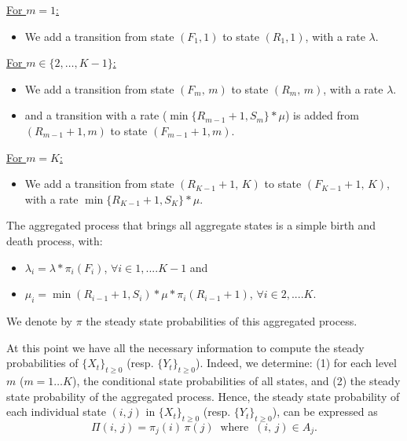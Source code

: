 \documentclass[conference]{IEEEtran}
\begin{document}
\underline{For $m=1$:}

\begin{itemize}
    \item We add a transition  from state $(F_{1},1)$ to state $(R_{1},1)$, with a rate $\lambda$.
\end{itemize}

\underline{For $m \in \{2,\ldots,K-1\}$:}

\begin{itemize}
    \item We add a transition from state $(F_{m},\,m)$ to state $(R_{m},\,m)$,  with a rate $\lambda$.
    \item and a transition with a rate ($\min\{R_{m-1}+1,S_m\}*\mu$) is added from $(R_{m-1}+1,m)$ to state $(F_{m-1}+1,m)$.
\end{itemize}

\underline{For $m=K$:}

\begin{itemize}
    \item We add a transition from state $(R_{K-1}+1,\, K)$ to state $(F_{K-1}+1,\,K)$, with a rate $\min\{R_{K-1}+1,S_K\}*\mu$.
\end{itemize}



The aggregated process that brings all aggregate states  is a simple birth and death process, with:

\begin{itemize}
\item $\lambda_{i}=\lambda*\pi_{i}(F_{i})$,\;\; $\forall i \in {1,....K-1}$ and

\item $\mu_{i}=\min(R_{i-1}+1,S_i)*\mu*\pi_{i}(R_{i-1}+1)$,\; $\forall i \in {2,....K}$.
\end{itemize}
We denote by $\pi$ the steady state probabilities of this aggregated process.


At this point we have all the necessary information to compute the steady probabilities of $\{X_{t}\}_{t \geq 0}$ (resp. $\{Y_{t}\}_{t \geq 0}$). Indeed, we determine: (1) for each level $m$ ($m=1\ldots K$), the conditional state probabilities of all states, and (2) the steady state probability of the aggregated process. Hence,  the steady state probability of each individual state $(i,j)$ in $\{X_{t}\}_{t \geq 0}$ (resp. $\{Y_{t}\}_{t \geq 0}$),  can be expressed as
\begin{equation*}
\Pi(i,\,j)=\pi_j(i)\,\pi(j)\;\; \mbox{where} \;\; (i,\,j)\in A_j.
\end{equation*}
\end{document}
